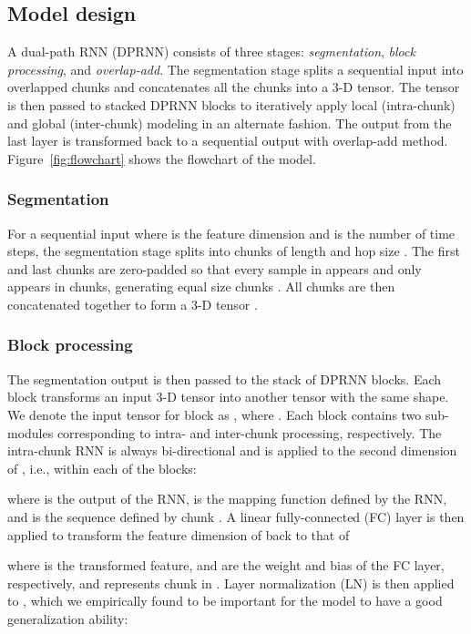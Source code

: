 \documentclass{article}
\begin{document}
\subsection{Model design}

A dual-path RNN (DPRNN) consists of three stages: \textit{segmentation}, \textit{block processing}, and \textit{overlap-add}. The segmentation stage splits a sequential input into overlapped chunks and concatenates all the chunks into a 3-D tensor. The tensor is then passed to stacked DPRNN blocks to iteratively apply local (intra-chunk) and global (inter-chunk) modeling in an alternate fashion. The output from the last layer is transformed back to a sequential output with overlap-add method. Figure~\ref{fig:flowchart} shows the flowchart of the model.

\subsubsection{Segmentation}

For a sequential input  where  is the feature dimension and  is the number of time steps, the segmentation stage splits  into chunks of length  and hop size . The first and last chunks are zero-padded so that every sample in  appears and only appears in  chunks, generating  equal size chunks . All chunks are then concatenated together to form a 3-D tensor .

\subsubsection{Block processing}

The segmentation output  is then passed to the stack of  DPRNN blocks. 
Each block transforms an input 3-D tensor into another tensor with the same shape. 
We denote the input tensor for block  as , where . Each block contains two sub-modules corresponding to intra- and inter-chunk processing, respectively. The intra-chunk RNN is always bi-directional and is applied to the second dimension of , i.e., within each of the  blocks:

where  is the output of the RNN,  is the mapping function defined by the RNN, and  is the sequence defined by chunk . A linear fully-connected (FC) layer is then applied to transform the feature dimension of  back to that of 

where  is the transformed feature,  and  are the weight and bias of the FC layer, respectively, and  represents chunk  in . Layer normalization (LN) \cite{ba2016layer} is then applied to , which we empirically found to be important for the model to have a good generalization ability:
\end{document}
